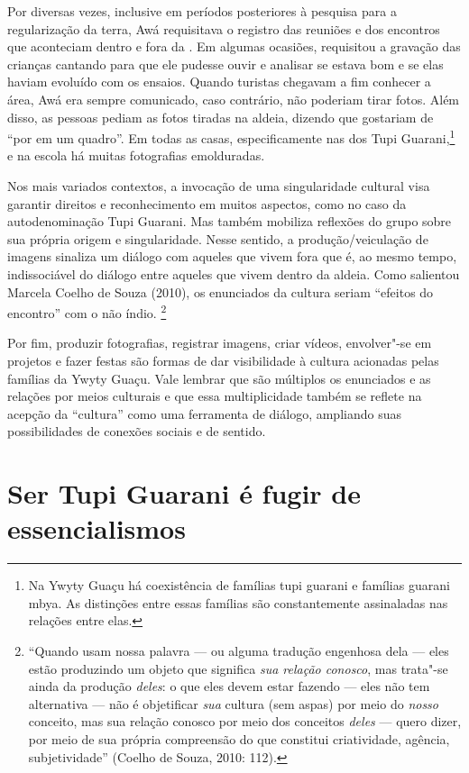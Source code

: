 Por diversas vezes, inclusive em períodos posteriores à pesquisa para a
regularização da terra, Awá requisitava o registro das reuniões e dos
encontros que aconteciam dentro e fora da . Em algumas ocasiões,
requisitou a gravação das crianças cantando para que ele pudesse ouvir
e analisar se estava bom e se elas haviam evoluído com os ensaios.
Quando turistas chegavam a fim conhecer a área, Awá era sempre
comunicado, caso contrário, não poderiam tirar fotos. Além disso, as
pessoas pediam as fotos tiradas na aldeia, dizendo que gostariam de ``por
em um quadro''. Em todas as casas, especificamente nas dos Tupi
Guarani,\footnote{Na Ywyty Guaçu há coexistência de famílias tupi
guarani e famílias guarani mbya. As distinções entre essas famílias são
constantemente assinaladas nas relações entre elas.} e na escola há
muitas fotografias emolduradas.

Nos mais variados contextos, a invocação de uma singularidade cultural
visa garantir direitos e reconhecimento em muitos aspectos, como no
caso da autodenominação Tupi Guarani. Mas também mobiliza reflexões do
grupo sobre sua própria origem e singularidade. Nesse sentido, a
produção/veiculação de imagens sinaliza um diálogo com aqueles que
vivem fora que é, ao mesmo tempo, indissociável do diálogo entre
aqueles que vivem dentro da aldeia. Como salientou Marcela Coelho de
Souza (2010), os enunciados da cultura seriam ``efeitos do encontro'' com
o não índio. \footnote{``Quando usam nossa palavra --- ou alguma tradução
engenhosa dela --- eles estão produzindo um objeto que significa \emph{sua
relação conosco}, mas trata"-se ainda da produção \emph{deles}: o que eles devem
estar fazendo --- eles não tem alternativa --- não é objetificar \emph{sua}
cultura (sem aspas) por meio do \emph{nosso} conceito, mas sua relação conosco
por meio dos conceitos \emph{deles} --- quero dizer, por meio de sua própria
compreensão do que constitui criatividade, agência, subjetividade''
(Coelho de Souza, 2010: 112).}

Por fim, produzir fotografias, registrar imagens, criar vídeos,
envolver"-se em projetos e fazer festas são formas de dar visibilidade à
cultura acionadas pelas famílias da Ywyty Guaçu. Vale lembrar que são
múltiplos os enunciados e as relações por meios culturais e que essa
multiplicidade também se reflete na acepção da ``cultura'' como uma
ferramenta de diálogo, ampliando suas possibilidades de conexões
sociais e de sentido.

\section{Ser Tupi Guarani é fugir de essencialismos}

